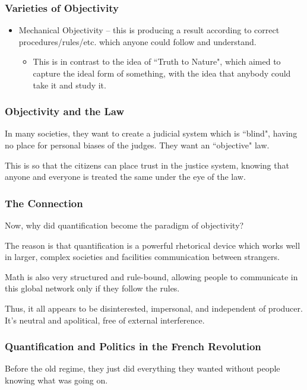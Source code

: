 \documentclass[openany]{book}
\begin{document}
\subsubsection{Varieties of Objectivity}
\begin{itemize}
	\item Mechanical Objectivity -- this is producing a result according to correct procedures/rules/etc. which anyone could follow and understand.
	\begin{itemize}
		\item This is in contrast to the idea of ``Truth to Nature", which aimed to capture the ideal form of something, with the idea that anybody could take it and study it.
	\end{itemize}
\end{itemize}

\subsubsection{Objectivity and the Law}
In many societies, they want to create a judicial system which is ``blind", having no place for personal biases of the judges. They want an ``objective" law.

This is so that the citizens can place trust in the justice system, knowing that anyone and everyone is treated the same under the eye of the law.

\subsubsection{The Connection}
Now, why did quantification become the paradigm of objectivity?

The reason is that quantification is a powerful rhetorical device which works well in larger, complex societies and facilities communication between strangers.

Math is also very structured and rule-bound, allowing people to communicate in this global network only if they follow the rules.

Thus, it all appears to be disinterested, impersonal, and independent of producer. It's neutral and apolitical, free of external interference.

\subsubsection{Quantification and Politics in the French Revolution}
Before the old regime, they just did everything they wanted without people knowing what was going on.
\end{document}

